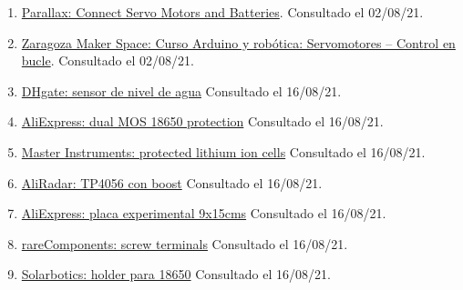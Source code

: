 \documentclass[12pt]{article}
\begin{document}
\begin{enumerate}
				\item
				\label{parallex servo}
				\href{https://learn.parallax.com/tutorials/robot/shield-bot/robotics-board-education-shield-arduino/chapter-2-shield-lights-servo-10}{Parallax: Connect Servo Motors and Batteries}. Consultado el 02/08/21.
				
				\item
				\label{zaragoza maker arduino y servo curso}
				\href{https://zaragozamakerspace.com/index.php/lessons/curso-arduino-y-robotica-servomotores/}{Zaragoza Maker Space: Curso Arduino y robótica: Servomotores – Control en bucle}. Consultado el 02/08/21.
				
				\item 
				\label{bib: dhgate}
				\href{https://es.dhgate.com/product/longteng-dc-220v-liquid-water-level-sensor/441493541.html}{DHgate: sensor de nivel de agua} Consultado el 16/08/21.
				
				\item 
				\label{bib: aliexpress dual mos}
				\href{https://es.aliexpress.com/i/32985307442.html}{AliExpress: dual MOS 18650 protection} Consultado el 16/08/21.
				
				\item 
				\label{bib: protected li-ion cells}
				\href{https://www.master-instruments.com.au/news-article/119/Protected\%20Lithium\%20Ion\%20Cells.html}{Master Instruments: protected lithium ion cells} Consultado el 16/08/21.
				
				\item 
				\label{bib: aliradar tp4056 con boost}
				\href{https://en.aliradar.com/item/4001246163578-lithium-li-ion-18650-3.7v-4.2v-9v-5v-2a-battery-charger-board-adjustable-dc-dc-step-up-boost-module-tp4056}{AliRadar: TP4056 con boost} Consultado el 16/08/21.
				
				\item 
				\label{bib: aliexpress placa exp}
				\href{https://es.aliexpress.com/item/32752226972.html}{AliExpress: placa experimental 9x15cms} Consultado el 16/08/21.
				
				\item 
				\label{bib: rarecomponents screw}
				\href{https://rarecomponents.com/store/1219}{rareComponents: screw terminals} Consultado el 16/08/21.
				
				\item 
				\label{bib: solarbotics holder para 18650}
				\href{https://solarbotics.com/product/600058/}{Solarbotics: holder para 18650} Consultado el 16/08/21.
				

\end{enumerate}
\end{document}
